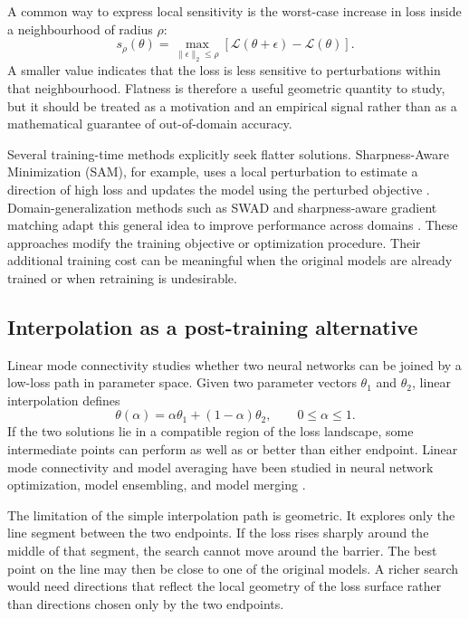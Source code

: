 \documentclass[11pt,a4paper]{article}
\begin{document}
A common way to express local sensitivity is the worst-case increase in loss inside a neighbourhood of radius $\rho$:
\begin{equation}
 s_{\rho}(\theta)=\max_{\|\epsilon\|_2\leq\rho}
 \left[\mathcal{L}(\theta+\epsilon)-\mathcal{L}(\theta)\right].
 \label{eq:sharpness}
\end{equation}
A smaller value indicates that the loss is less sensitive to perturbations within that neighbourhood. Flatness is therefore a useful geometric quantity to study, but it should be treated as a motivation and an empirical signal rather than as a mathematical guarantee of out-of-domain accuracy.

Several training-time methods explicitly seek flatter solutions. Sharpness-Aware Minimization (SAM), for example, uses a local perturbation to estimate a direction of high loss and updates the model using the perturbed objective \cite{foret2021sharpness}. Domain-generalization methods such as SWAD and sharpness-aware gradient matching adapt this general idea to improve performance across domains \cite{cha2021swad,wang2023sagm}. These approaches modify the training objective or optimization procedure. Their additional training cost can be meaningful when the original models are already trained or when retraining is undesirable.

\subsection{Interpolation as a post-training alternative}
Linear mode connectivity studies whether two neural networks can be joined by a low-loss path in parameter space. Given two parameter vectors $\theta_1$ and $\theta_2$, linear interpolation defines
\begin{equation}
 \theta(\alpha)=\alpha\theta_1+(1-\alpha)\theta_2,
 \qquad 0\leq\alpha\leq1.
 \label{eq:linear_interpolation}
\end{equation}
If the two solutions lie in a compatible region of the loss landscape, some intermediate points can perform as well as or better than either endpoint. Linear mode connectivity and model averaging have been studied in neural network optimization, model ensembling, and model merging \cite{garipov2018loss,draxler2018barriers,frankle2020linear,izmailov2018swa,wortsman2022soups}.

The limitation of the simple interpolation path is geometric. It explores only the line segment between the two endpoints. If the loss rises sharply around the middle of that segment, the search cannot move around the barrier. The best point on the line may then be close to one of the original models. A richer search would need directions that reflect the local geometry of the loss surface rather than directions chosen only by the two endpoints.
\end{document}
